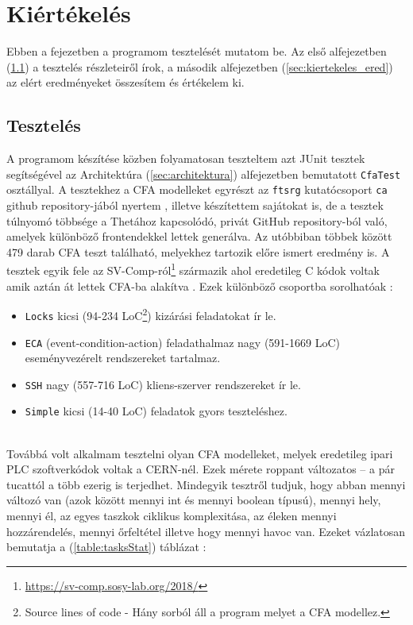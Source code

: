 \chapter{Kiértékelés}
\label{sec:kiertekeles}

Ebben a fejezetben a programom tesztelését mutatom be. Az első alfejezetben (\ref{sec:kiertekeles_teszt}) a tesztelés részleteiről írok, a második alfejezetben (\ref{sec:kiertekeles_ered}) az elért eredményeket összesítem és értékelem ki.

\section{Tesztelés}
\label{sec:kiertekeles_teszt}
A programom készítése közben folyamatosan teszteltem azt JUnit tesztek segítségével az Architektúra (\ref{sec:architektura}) alfejezetben bemutatott \texttt{CfaTest} osztállyal. A tesztekhez a CFA modelleket egyrészt az \texttt{ftsrg} kutatócsoport \texttt{ca} github repository-jából nyertem \cite{ca-lab-tests}, illetve készítettem sajátokat is, de a tesztek túlnyomó többsége a Thetához kapcsolódó, privát GitHub repository-ból való, amelyek különböző frontendekkel lettek generálva. Az utóbbiban többek között 479 darab CFA teszt található, melyekhez tartozik előre ismert eredmény is. A tesztek egyik fele az SV-Comp-ról\footnote{\url{https://sv-comp.sosy-lab.org/2018/}} származik ahol eredetileg C kódok voltak amik aztán át lettek CFA-ba alakítva \cite{vpt2017}. Ezek különböző csoportba sorolhatóak \cite{akos-phd}:

\begin{itemize}
	\label{felsorolas}
	
	\item \texttt{Locks} kicsi (94-234 LoC\footnote{Source lines of code - Hány sorból áll a program melyet a CFA modellez.}) kizárási feladatokat ír le.
	
	\item \texttt{ECA} (event-condition-action) feladathalmaz nagy (591-1669 LoC) eseményvezérelt rendszereket tartalmaz.
	
	\item \texttt{SSH} nagy (557-716 LoC) kliens-szerver rendszereket ír le.
	
	\item \texttt{Simple} kicsi (14-40 LoC) feladatok gyors teszteléshez.
\end{itemize}
\ \\
Továbbá volt alkalmam tesztelni olyan CFA modelleket, melyek eredetileg ipari PLC szoftverkódok voltak a CERN-nél. \cite{darvas2019plcverif} Ezek mérete roppant változatos -- a pár tucattól a több ezerig is terjedhet. Mindegyik tesztről tudjuk, hogy abban mennyi változó van (azok között mennyi int és mennyi boolean típusú), mennyi hely, mennyi él, az egyes taszkok ciklikus komplexitása, az éleken mennyi hozzárendelés, mennyi őrfeltétel illetve hogy mennyi havoc van. Ezeket vázlatosan bemutatja a (\ref{table:tasksStat}) táblázat \cite{akos-phd}:

